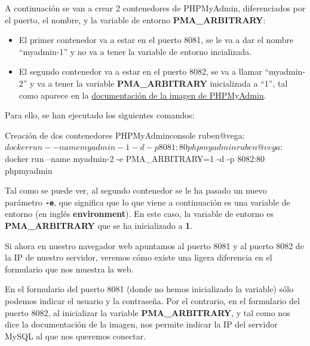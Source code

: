 A continuación se van a crear 2 contenedores de PHPMyAdmin, diferenciados por el puerto, el nombre, y la variable de entorno \textbf{PMA\_ARBITRARY}:
\begin{itemize}
    \item El primer contenedor va a estar en el puerto 8081, se le va a dar el nombre “myadmin-1” y no va a tener la variable de entorno incializada.
    \item El segundo contenedor va a estar en el puerto 8082, se va a llamar “myadmin-2” y va a tener la variable \textbf{PMA\_ARBITRARY} inicializada a “1”, tal como aparece en la \href{https://hub.docker.com/_/phpmyadmin}{documentación de la imagen de PHPMyAdmin}.
\end{itemize}

Para ello, se han ejecutado los siguientes comandos:

\begin{mycode}{Creación de dos contenedores PHPMyAdmin}{console}{{\footnotesize }}
ruben@vega:~$ docker run --name myadmin-1 -d -p 8081:80 phpmyadmin

ruben@vega:~$ docker run --name myadmin-2 -e PMA_ARBITRARY=1 -d -p 8082:80 phpmyadmin
\end{mycode}

Tal como se puede ver, al segundo contenedor se le ha pasado un nuevo parámetro \textbf{\texttt{-e}}, que significa que lo que viene a continuación es una variable de entorno (en inglés \textbf{environment}). En este caso, la variable de entorno es \textbf{PMA\_ARBITRARY} que se ha inicializado a \textbf{1}.

Si ahora en nuestro navegador web apuntamos al puerto 8081 y al puerto 8082 de la IP de nuestro servidor, veremos cómo existe una ligera diferencia en el formulario que nos muestra la web.

En el formulario del puerto 8081 (donde no hemos inicializado la variable) sólo podemos indicar el usuario y la contraseña. Por el contrario, en el formulario del puerto 8082, al inicializar la variable \textbf{PMA\_ARBITRARY}, y tal como nos dice la documentación de la imagen, nos permite indicar la IP del servidor MySQL al que nos queremos conectar.

